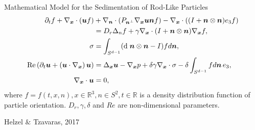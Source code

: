 \begin{frame}{Mathematical Model for the Sedimentation of Rod-Like Particles}
	\scriptsize
	\begin{align*}
		\partial_t f+\nabla_{\boldsymbol{x}} \cdot(\boldsymbol{u} f) & +\nabla_{\boldsymbol{n}} \cdot\left(P_{\boldsymbol{n}^{\perp}} \nabla_{\boldsymbol{x}} \boldsymbol{u} \boldsymbol{n} f\right)-\nabla_{\boldsymbol{x}} \cdot\left((I+\boldsymbol{n} \otimes \boldsymbol{n}) e_3 f\right) \\
		& =D_r \Delta_n f+\gamma \nabla_{\boldsymbol{x}} \cdot(I+\boldsymbol{n} \otimes \boldsymbol{n}) \nabla_{\boldsymbol{x}} f, \notag \\
		\sigma & =\int_{S^{d-1}}(\text{d} \; \boldsymbol{n} \otimes \boldsymbol{n}-I) f d \boldsymbol{n},  \\
		\operatorname{Re}\left(\partial_t \boldsymbol{u}+\left(\boldsymbol{u} \cdot \nabla_{\boldsymbol{x}}\right) \boldsymbol{u}\right) & =\Delta_{\boldsymbol{x}} \boldsymbol{u}-\nabla_{\boldsymbol{x}} p+\delta \gamma \nabla_{\boldsymbol{x}} \cdot \sigma-\delta \int_{S^{d-1}} f d \boldsymbol{n} \, e_3, \\
		\nabla_{\boldsymbol{x}} \cdot \boldsymbol{u} & =0,
	\end{align*}
	where $f = f(t, x, n), x \in \mathbb{R}^3 , n \in  S^2, t \in \mathbb{R}$ is a density distribution function of particle orientation. $D_r, \gamma, \delta$ and $Re$ are non-dimensional parameters.
	
	\begin{beamercolorbox}[sep=1em,wd=\linewidth,right]{}
		\tiny{Helzel $\&$ Tzavaras, 2017}
	\end{beamercolorbox}
\end{frame}




